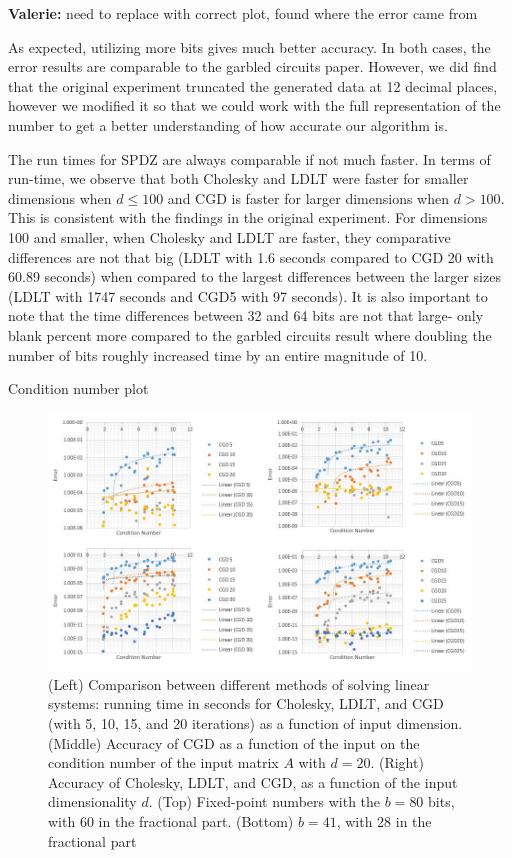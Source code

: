 \documentclass{article}
\theoremstyle{plain}
\theoremstyle{definition}
\theoremstyle{remark}
\newcommand{\vc}[1]{{\textcolor{lred}{\textbf{Valerie:} #1}}}
\begin{document}
\vc{need to replace with correct plot, found where the error came from}

As expected, utilizing more bits gives much better accuracy. In both cases, the error results are comparable to the garbled circuits paper. However, we did find that the original experiment truncated the generated data at 12 decimal places, however we modified it so that we could work with the full representation of the number to get a better understanding of how accurate our algorithm is.  

The run times for SPDZ are always comparable if not much faster. In terms of run-time, we observe that both Cholesky and LDLT were faster for smaller dimensions when $d \leq 100$ and CGD is faster for larger dimensions when $d > 100$. This is consistent with the findings in the original experiment. For dimensions 100 and smaller, when Cholesky and LDLT are faster, they comparative differences are not that big (LDLT with 1.6 seconds compared to CGD 20 with 60.89 seconds) when compared to the largest differences between the larger sizes (LDLT with 1747 seconds and CGD5 with 97 seconds). It is also important to note that the time differences between 32 and 64 bits are not that large- only blank percent more compared to the garbled circuits result where doubling the number of bits roughly increased time by an entire magnitude of 10.  

Condition number plot
\begin{figure}[h]
  \includegraphics[width=\linewidth]{conditionnumber.jpg}
  \caption{(Left) Comparison between different methods of solving linear systems: running time in seconds for Cholesky, LDLT, and CGD (with 5, 10, 15, and 20 iterations) as a function of input dimension. (Middle) Accuracy of CGD as a function of the input on the condition number of the input matrix $A$ with $d = 20$. (Right) Accuracy of Cholesky, LDLT, and CGD, as a function of the input dimensionality $d$. (Top) Fixed-point numbers with the $b = 80$ bits, with 60 in the fractional part. (Bottom) $b = 41$, with 28 in the fractional part}
  \label{fig:result3}
\end{figure}
\end{document}
